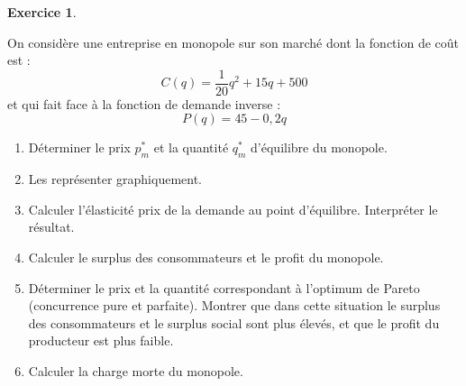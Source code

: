 \documentclass[
]{book}
\providecommand{\tightlist}{%
  \setlength{\itemsep}{0pt}\setlength{\parskip}{0pt}}
\theoremstyle{definition}
\theoremstyle{definition}
\theoremstyle{definition}
\newtheorem{exercise}{Exercice}[chapter]
\theoremstyle{definition}
\theoremstyle{remark}
\begin{document}
\begin{exercise}
\protect\hypertarget{exr:monoexo2}{}\label{exr:monoexo2}

On considère une entreprise en monopole sur son marché dont la fonction de coût est :
\[C(q)=\frac{1}{20} q^2+15q+500\]
et qui fait face à la fonction de demande inverse : \[P(q)=45-0,2q\]

\begin{enumerate}
\def\labelenumi{\arabic{enumi}.}
\tightlist
\item
  Déterminer le prix \(p_m^*\) et la quantité \(q_m^*\) d'équilibre du monopole.
\item
  Les représenter graphiquement.
\item
  Calculer l'élasticité prix de la demande au point d'équilibre. Interpréter le résultat.
\item
  Calculer le surplus des consommateurs et le profit du monopole.
\item
  Déterminer le prix et la quantité correspondant à l'optimum de Pareto (concurrence pure et parfaite). Montrer que dans cette situation le surplus des consommateurs et le surplus social sont plus élevés, et que le profit du producteur est plus faible.
\item
  Calculer la charge morte du monopole.
\end{enumerate}

\end{exercise}
\end{document}
